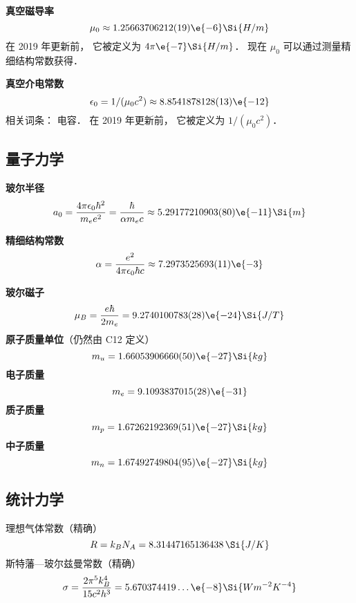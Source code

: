 \textbf{真空磁导率}
\begin{equation}
\mu_0 \approx 1.25663706212(19)\e{-6} \Si{H/m}
\end{equation}
在 2019 年更新前， 它被定义为 $4\pi\e{-7} \Si{H/m}$． 现在 $\mu_0$ 可以通过测量精细结构常数获得．

\textbf{真空介电常数}
\begin{equation}
\epsilon_0 = 1/(\mu_0 c^2) \approx 8.8541878128(13)\e{-12}
\end{equation}
相关词条： 电容． 在 2019 年更新前， 它被定义为 $1/(\mu_0 c^2)$．

\subsection{量子力学}
\textbf{玻尔半径}
\begin{equation}
a_0 = \frac{4\pi \epsilon_0 \hbar^2}{m_e e^2} = \frac{\hbar}{\alpha m_e c} \approx 5.29177210903(80)\e{-11}\Si{m}
\end{equation}

\textbf{精细结构常数}
\begin{equation}
\alpha = \frac{e^2}{4\pi\epsilon_0\hbar c} \approx 7.2973525693(11)\e{-3}
\end{equation}

\textbf{玻尔磁子}
\begin{equation}
\mu_B = \frac{e\hbar}{2m_e} = 9.2740100783(28)\e{-24} \Si{J/T}
\end{equation}
\textbf{原子质量单位}（仍然由 C12 定义）
\begin{equation}
m_u = 1.66053906660(50)\e{-27} \Si{kg}
\end{equation}
\textbf{电子质量}
\begin{equation}
m_e = 9.1093837015(28)\e{-31}
\end{equation}
\textbf{质子质量}
\begin{equation}
m_p = 1.67262192369(51)\e{-27}\Si{kg}
\end{equation}
\textbf{中子质量}
\begin{equation}
m_n = 1.67492749804(95)\e{-27}\Si{kg}
\end{equation}

\subsection{统计力学}
理想气体常数（精确）
\begin{equation}
R = k_B N_A = 8.31447165136438 \,\Si{J/K}
\end{equation}
斯特藩—玻尔兹曼常数（精确）
\begin{equation}
\sigma = \frac{2\pi^5k_B^4}{15c^2h^3} = 5.670374419\dots\e{-8} \Si{Wm^{-2}K^{-4}}
\end{equation}
